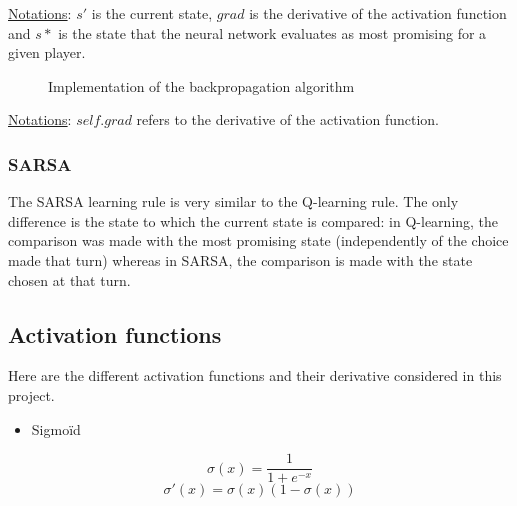 \documentclass{article}
\begin{document}
\underline{Notations}: $s'$ is the current state, $grad$ is the derivative of the activation function and $s*$ is the state that the neural network evaluates as most promising for a given player.

\begin{figure}[H]
    \begin{center}
      \label{code:bp-code}
      \caption{Implementation of the backpropagation algorithm}
    \end{center}
\end{figure}

\underline{Notations}: $self.grad$ refers to the derivative of the activation function.

\subsubsection{SARSA}

The SARSA learning rule is very similar to the Q-learning rule. The only difference is the state to which the current state is compared: in Q-learning, the comparison was made with the most promising state (independently of the choice made that turn) whereas in SARSA, the comparison is made with the state chosen at that turn.

\subsection{Activation functions}

Here are the different activation functions and their derivative considered in this project.

\begin{itemize}
    \item Sigmoïd
\end{itemize}

$$ \sigma(x) =  \frac{1}{1 + e^{-x}}  $$
$$ \sigma'(x) =  \sigma(x)(1 - \sigma(x))  $$
\end{document}
